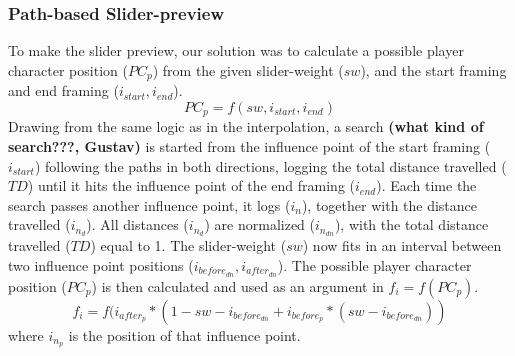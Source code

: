\subsubsection{Path-based Slider-preview}
To make the slider preview, our solution was to calculate a possible player character position ($PC_{p}$) from the given slider-weight ($sw$), and the start framing and end framing ($i_{start}, i_{end}$).
\begin{equation}
PC_{p} = f(sw, i_{start}, i_{end})
\end{equation}
Drawing from the same logic as in the interpolation, a search \textbf{(what kind of search???, Gustav)} is started from the influence point of the start framing ($i_{start}$) following the paths in both directions, logging the total distance travelled ($TD$) until it hits the influence point of the end framing ($i_{end}$). Each time the search passes another influence point, it logs ($i_{n}$), together with the distance travelled ($i_{n_{d}}$). All distances ($i_{n_{d}}$) are normalized ($i_{n_{dn}}$), with the total distance travelled ($TD$) equal to 1. The slider-weight ($sw$) now fits in an interval between two influence point positions ($i_{before_{dn}}, i_{after_{dn}}$). The possible player character position ($PC_{p}$) is then calculated and used as an argument in $f_{i} = f(PC_{p})$.
\begin{equation}
f_{i} = f(i_{after_{p}} * (1 - sw - i_{before_{dn}} + i_{before_{p}} * (sw - i_{before_{dn}}))
\end{equation}
where $i_{n_{p}}$ is the position of that influence point.